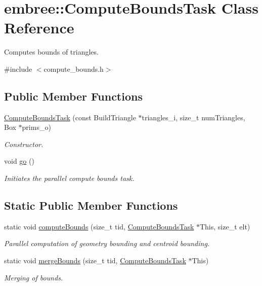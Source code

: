 \hypertarget{classembree_1_1_compute_bounds_task}{
\section{embree::ComputeBoundsTask Class Reference}
\label{classembree_1_1_compute_bounds_task}
}


Computes bounds of triangles.  




{\ttfamily \#include $<$compute\_\-bounds.h$>$}

\subsection*{Public Member Functions}
\begin{DoxyCompactItemize}
\item 
\hyperlink{classembree_1_1_compute_bounds_task_ad5782489c54e8497e8ffa5642e76a7b4}{ComputeBoundsTask} (const BuildTriangle $\ast$triangles\_\-i, size\_\-t numTriangles, Box $\ast$prims\_\-o)
\begin{DoxyCompactList}\small\item\em Constructor. \item\end{DoxyCompactList}\item 
void \hyperlink{classembree_1_1_compute_bounds_task_a65a2620317492e8b96819d54b24c8a72}{go} ()
\begin{DoxyCompactList}\small\item\em Initiates the parallel compute bounds task. \item\end{DoxyCompactList}\end{DoxyCompactItemize}
\subsection*{Static Public Member Functions}
\begin{DoxyCompactItemize}
\item 
static void \hyperlink{classembree_1_1_compute_bounds_task_a1380790c5816494778c99218b1e979f9}{computeBounds} (size\_\-t tid, \hyperlink{classembree_1_1_compute_bounds_task}{ComputeBoundsTask} $\ast$This, size\_\-t elt)
\begin{DoxyCompactList}\small\item\em Parallel computation of geometry bounding and centroid bounding. \item\end{DoxyCompactList}\item 
static void \hyperlink{classembree_1_1_compute_bounds_task_a77b1f9885a52fb87d9efb975a1e4ab28}{mergeBounds} (size\_\-t tid, \hyperlink{classembree_1_1_compute_bounds_task}{ComputeBoundsTask} $\ast$This)
\begin{DoxyCompactList}\small\item\em Merging of bounds. \item\end{DoxyCompactList}\end{DoxyCompactItemize}
